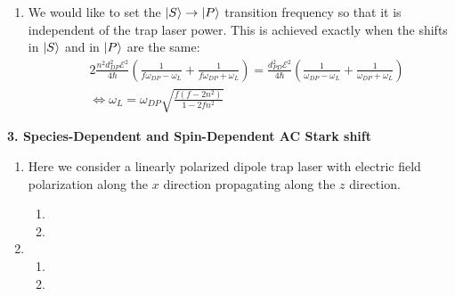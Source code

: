 \documentclass{article}
\theoremstyle{definition}
\newcommand{\f}[2]{\frac{#1}{#2}}
\newcommand{\lp}{\left(}
\newcommand{\rp}{\right)}
\begin{document}
\begin{enumerate}[label=(\alph*)]
\begin{enumerate}[label=(\roman*)]
		\item We would like to set the $\ket{S}\to \ket{P}$ transition frequency so that it is independent of the trap laser power. This is achieved exactly when the shifts in $\ket{S}$ and in $\ket{P}$ are the same:
		\begin{align*}
		&2\f{n^2d_{DP}^2\mathcal{E}^2}{4\hbar}\lp \f{1}{f\omega_{DP} - \omega_L} + \f{1}{f\omega_{DP} + \omega_L} \rp = \f{d_{PD}^2 \mathcal{E}^2}{4\hbar}\lp \f{1}{\omega_{DP} - \omega_L} + \f{1}{\omega_{DP} + \omega_L} \rp\\
		&\iff \boxed{\omega_L = \omega_{DP} \sqrt{\f{f(f-2n^2)}{1-2fn^2}}  }
		\end{align*}
		
		
	\end{enumerate}
\end{enumerate}


\noindent \textbf{3. Species-Dependent and Spin-Dependent AC Stark shift}	
	
\begin{enumerate}[label=(\alph*)]
	\item Here we consider a linearly polarized dipole trap laser with electric field polarization along the $x$ direction propagating along the $z$ direction. 
	
	\begin{enumerate}[label=(\roman*)]
		\item 
		
		\item 
		

	\end{enumerate}
	
	\item 
	
	\begin{enumerate}[label=(\roman*)]
		\item 
		
		\item 
		
		
	\end{enumerate}
\end{enumerate}
	
	
\end{document}
